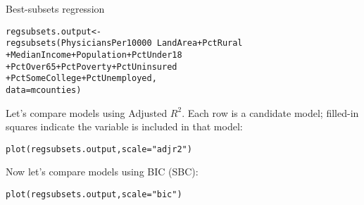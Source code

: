\documentclass{beamer}\usepackage[]{graphicx}\usepackage[]{color}
\makeatletter
\newcommand{\hlstr}[1]{\textcolor[rgb]{1,0.894,0.71}{#1}}%
\newcommand{\hlopt}[1]{\textcolor[rgb]{1,0.894,0.769}{#1}}%
\newcommand{\hlstd}[1]{\textcolor[rgb]{1,0.894,0.769}{#1}}%
\newcommand{\hlkwb}[1]{\textcolor[rgb]{0.804,0.776,0.451}{#1}}%
\newcommand{\hlkwc}[1]{\textcolor[rgb]{0.78,0.941,0.545}{#1}}%
\newcommand{\hlkwd}[1]{\textcolor[rgb]{1,0.78,0.769}{#1}}%
\newenvironment{kframe}{%
 \def\at@end@of@kframe{}%
 \ifinner\ifhmode%
  \def\at@end@of@kframe{\end{minipage}}%
  \begin{minipage}{\columnwidth}%
 \fi\fi%
 \def\FrameCommand##1{\hskip\@totalleftmargin \hskip-\fboxsep
 \colorbox{shadecolor}{##1}\hskip-\fboxsep
     \hskip-\linewidth \hskip-\@totalleftmargin \hskip\columnwidth}%
 \MakeFramed {\advance\hsize-\width
   \@totalleftmargin\z@ \linewidth\hsize
   \@setminipage}}%
 {\par\unskip\endMakeFramed%
 \at@end@of@kframe}
\newenvironment{knitrout}{}{} %
\makeatother
\begin{document}
\begin{darkframes}
    \begin{frame}[fragile]{Best-subsets regression}
\begin{knitrout}
\begin{kframe}
\begin{alltt}
\hlstd{regsubsets.output} \hlkwb{<-}
  \hlkwd{regsubsets}\hlstd{(PhysiciansPer10000} \hlopt{~} \hlstd{LandArea} \hlopt{+} \hlstd{PctRural}
             \hlopt{+} \hlstd{MedianIncome} \hlopt{+} \hlstd{Population} \hlopt{+} \hlstd{PctUnder18}
             \hlopt{+} \hlstd{PctOver65} \hlopt{+} \hlstd{PctPoverty} \hlopt{+} \hlstd{PctUninsured}
             \hlopt{+} \hlstd{PctSomeCollege} \hlopt{+} \hlstd{PctUnemployed,}
             \hlkwc{data}\hlstd{=mcounties)}
\end{alltt}
\end{kframe}
\end{knitrout}
    \end{frame}




    \begin{frame}[fragile]
      \fontsize{9}{9}\selectfont
      Let's compare models using Adjusted $R^2$. Each row is a candidate model; filled-in squares indicate the variable is included in that model:

\begin{knitrout}
\begin{kframe}
\begin{alltt}
\hlkwd{plot}\hlstd{(regsubsets.output,} \hlkwc{scale}\hlstd{=}\hlstr{"adjr2"}\hlstd{)}
\end{alltt}
\end{kframe}
\end{knitrout}

      \vspace{-1in}

\begin{knitrout}


\end{knitrout}
    \end{frame}

    \begin{frame}[fragile]
      \fontsize{9}{9}\selectfont
      Now let's compare models using BIC (SBC):

\begin{knitrout}
\begin{kframe}
\begin{alltt}
\hlkwd{plot}\hlstd{(regsubsets.output,} \hlkwc{scale}\hlstd{=}\hlstr{"bic"}\hlstd{)}
\end{alltt}
\end{kframe}
\end{knitrout}


\end{frame}
\end{darkframes}
\end{document}
